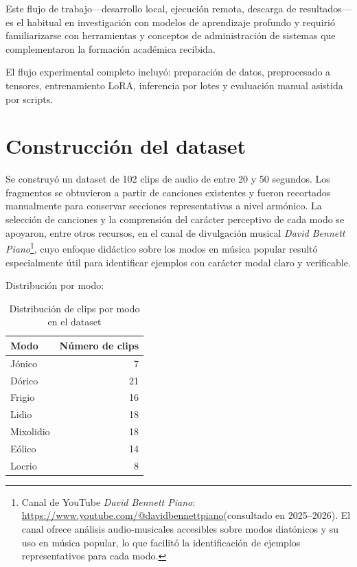 \documentclass[%
    school=etsisi,%
    type=pfg,%
    degree=61CD,%
]{upm-report}
\begin{document}
Este flujo de trabajo---desarrollo local, ejecuci\'on remota, descarga de resultados---es el habitual en investigaci\'on con modelos de aprendizaje profundo y requiri\'o familiarizarse con herramientas y conceptos de administraci\'on de sistemas que complementaron la formaci\'on acad\'emica recibida.

El flujo experimental completo incluy\'o: preparaci\'on de datos, preprocesado a tensores, entrenamiento LoRA, inferencia por lotes y evaluaci\'on manual asistida por scripts.

\section{Construcci\'on del dataset}

Se construy\'o un dataset de 102 clips de audio de entre 20 y 50 segundos. Los fragmentos se obtuvieron a partir de canciones existentes y fueron recortados manualmente para conservar secciones representativas a nivel arm\'onico. La selecci\'on de canciones y la comprensi\'on del car\'acter perceptivo de cada modo se apoyaron, entre otros recursos, en el canal de divulgaci\'on musical \textit{David Bennett Piano}\footnote{Canal de YouTube \textit{David Bennett Piano}: \url{https://www.youtube.com/@davidbennettpiano}\linebreak (consultado en 2025--2026). El canal ofrece an\'alisis audio-musicales accesibles sobre modos diat\'onicos y su uso en m\'usica popular, lo que facilit\'o la identificaci\'on de ejemplos representativos para cada modo.}, cuyo enfoque did\'actico sobre los modos en m\'usica popular result\'o especialmente \'util para identificar ejemplos con car\'acter modal claro y verificable.

Distribuci\'on por modo:

\begin{table}[htbp]
    \centering
    \caption{Distribuci\'on de clips por modo en el dataset}
    \begin{tabular}{lr}
        \toprule
        \textbf{Modo} & \textbf{N\'umero de clips} \\
        \midrule
        J\'onico & 7 \\
        D\'orico & 21 \\
        Frigio & 16 \\
        Lidio & 18 \\
        Mixolidio & 18 \\
        E\'olico & 14 \\
        Locrio & 8 \\
        \bottomrule
    \end{tabular}
\end{table}
\end{document}
